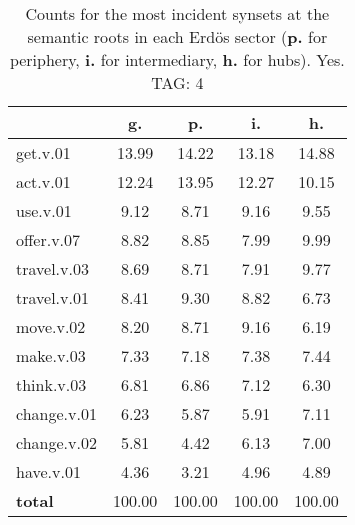 \begin{table}[h!]
\begin{center}
\begin{tabular}{| l || c | c | c | c |}\hline
 & {\bf g.} & {\bf p.} & {\bf i.} & {\bf h.} \\\hline\hline
get.v.01 & 13.99  & 14.22  & 13.18  & 14.88 \\\hline
act.v.01 & 12.24  & 13.95  & 12.27  & 10.15 \\\hline
use.v.01 & 9.12  & 8.71  & 9.16  & 9.55 \\\hline
offer.v.07 & 8.82  & 8.85  & 7.99  & 9.99 \\\hline
travel.v.03 & 8.69  & 8.71  & 7.91  & 9.77 \\\hline
travel.v.01 & 8.41  & 9.30  & 8.82  & 6.73 \\\hline
move.v.02 & 8.20  & 8.71  & 9.16  & 6.19 \\\hline
make.v.03 & 7.33  & 7.18  & 7.38  & 7.44 \\\hline
think.v.03 & 6.81  & 6.86  & 7.12  & 6.30 \\\hline
change.v.01 & 6.23  & 5.87  & 5.91  & 7.11 \\\hline
change.v.02 & 5.81  & 4.42  & 6.13  & 7.00 \\\hline
have.v.01 & 4.36  & 3.21  & 4.96  & 4.89 \\\hline\hline
{{\bf total}} & 100.00  & 100.00  & 100.00  & 100.00 \\\hline
\end{tabular}
\caption{Counts for the most incident synsets at the semantic roots in each Erd\"os sector ({\bf p.} for periphery, {\bf i.} for intermediary, {\bf h.} for hubs). Yes. TAG: 4}
\end{center}
\end{table}
